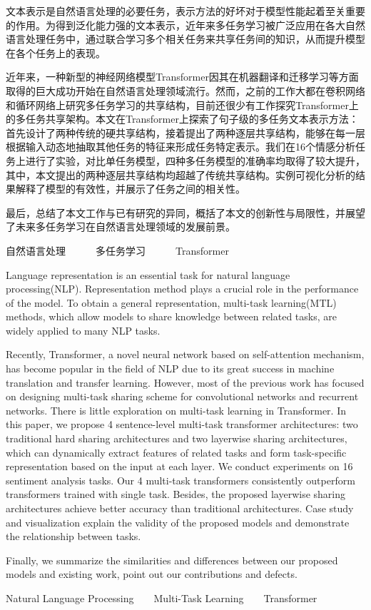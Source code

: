 \begin{cabstract}
	文本表示是自然语言处理的必要任务，表示方法的好坏对于模型性能起着至关重要的作用。为得到泛化能力强的文本表示，近年来多任务学习被广泛应用在各大自然语言处理任务中，通过联合学习多个相关任务来共享任务间的知识，从而提升模型在各个任务上的表现。
	
	近年来，一种新型的神经网络模型Transformer因其在机器翻译和迁移学习等方面取得的巨大成功开始在自然语言处理领域流行。然而，之前的工作大都在卷积网络和循环网络上研究多任务学习的共享结构，目前还很少有工作探究Transformer上的多任务共享架构。本文在Transformer上探索了句子级的多任务文本表示方法：首先设计了两种传统的硬共享结构，接着提出了两种逐层共享结构，能够在每一层根据输入动态地抽取其他任务的特征来形成任务特定表示。我们在16个情感分析任务上进行了实验，对比单任务模型，四种多任务模型的准确率均取得了较大提升，其中，本文提出的两种逐层共享结构均超越了传统共享结构。实例可视化分析的结果解释了模型的有效性，并展示了任务之间的相关性。
	
	最后，总结了本文工作与已有研究的异同，概括了本文的创新性与局限性，并展望了未来多任务学习在自然语言处理领域的发展前景。
\end{cabstract}


\begin{ckeywords}
	自然语言处理\ \ \ \ \ \ 多任务学习\ \ \ \ \ \ Transformer
\end{ckeywords}



\begin{eabstract}
	Language representation is an essential task for natural language processing(NLP). Representation method plays a crucial role in the performance of the model. To obtain a general representation, multi-task learning(MTL) methods, which allow models to share knowledge between related tasks, are widely applied to many NLP tasks.
	
	Recently, Transformer, a novel neural network based on self-attention mechanism, has become popular in the field of NLP due to its great success in machine translation and transfer learning. However, most of the previous work has focused on designing multi-task sharing scheme for convolutional networks and recurrent networks. There is little exploration on multi-task learning in Transformer. In this paper, we propose 4 sentence-level multi-task transformer architectures: two traditional hard sharing architectures and two layerwise sharing architectures, which can dynamically extract features of related tasks and form task-specific representation based on the input at each layer. We conduct experiments on 16 sentiment analysis tasks. Our 4 multi-task transformers consistently outperform transformers trained with single task. Besides, the proposed layerwise sharing architectures achieve better accuracy than traditional architectures. Case study and visualization explain the validity of the proposed models and demonstrate the relationship between tasks.
	
	Finally, we summarize the similarities and differences between our proposed models and existing work, point out our contributions and defects.
	
\end{eabstract}


\begin{ekeywords}
	Natural Language Processing\ \ \ \ Multi-Task Learning\ \ \ \ Transformer
\end{ekeywords}


